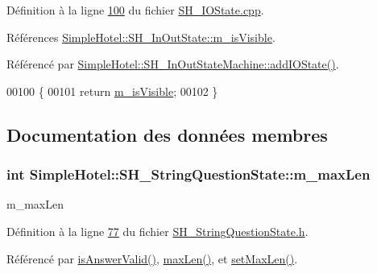 Définition à la ligne \hyperlink{SH__IOState_8cpp_source_l00100}{100} du fichier \hyperlink{SH__IOState_8cpp_source}{S\-H\-\_\-\-I\-O\-State.\-cpp}.



Références \hyperlink{classSimpleHotel_1_1SH__InOutState_a041ad53f3cdfb1b18ee002597e833848}{Simple\-Hotel\-::\-S\-H\-\_\-\-In\-Out\-State\-::m\-\_\-is\-Visible}.



Référencé par \hyperlink{classSimpleHotel_1_1SH__InOutStateMachine_a07ae9f1f74a9a41b26e77a014679a33e}{Simple\-Hotel\-::\-S\-H\-\_\-\-In\-Out\-State\-Machine\-::add\-I\-O\-State()}.


\begin{DoxyCode}
00100                                \{
00101     \textcolor{keywordflow}{return} \hyperlink{classSimpleHotel_1_1SH__InOutState_a041ad53f3cdfb1b18ee002597e833848}{m\_isVisible};
00102 \}
\end{DoxyCode}


\subsection{Documentation des données membres}
\hypertarget{classSimpleHotel_1_1SH__StringQuestionState_a536f87fad8a2f7f4edc314d34ba2c82b}{
\subsubsection[{m\-\_\-max\-Len}]{\setlength{\rightskip}{0pt plus 5cm}int Simple\-Hotel\-::\-S\-H\-\_\-\-String\-Question\-State\-::m\-\_\-max\-Len\hspace{0.3cm}{\ttfamily [private]}}}\label{classSimpleHotel_1_1SH__StringQuestionState_a536f87fad8a2f7f4edc314d34ba2c82b}


m\-\_\-max\-Len 



Définition à la ligne \hyperlink{SH__StringQuestionState_8h_source_l00077}{77} du fichier \hyperlink{SH__StringQuestionState_8h_source}{S\-H\-\_\-\-String\-Question\-State.\-h}.



Référencé par \hyperlink{classSimpleHotel_1_1SH__StringQuestionState_a64428aab057a96918f2f97815c7c2717}{is\-Answer\-Valid()}, \hyperlink{classSimpleHotel_1_1SH__StringQuestionState_a0e6c288a9af0b8d48238b24a07021457}{max\-Len()}, et \hyperlink{classSimpleHotel_1_1SH__StringQuestionState_add76bb81ad6095e3445e843c460c351e}{set\-Max\-Len()}.

